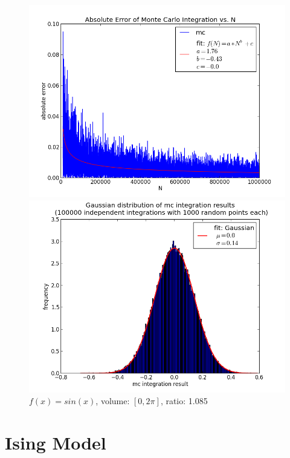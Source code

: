 \documentclass[12pt,a4paper,titlepage]{article}
\begin{document}
\begin{figure}
	\centering
	\caption{$f(x)=sin(x)$, volume: $[0,2\pi]$, ratio: 1.085}
	\begin{minipage}[b]{\linewidth}
		\centering
		\includegraphics[width=\linewidth]{Plots/sin}
	\end{minipage}
	\begin{minipage}[b]{\linewidth}
		\centering
		\includegraphics[width=\linewidth]{Plots/sin_hist}
	\end{minipage}
	\label{fig:linear}
\end{figure}



\newpage
\section{Ising Model}
\end{document}
